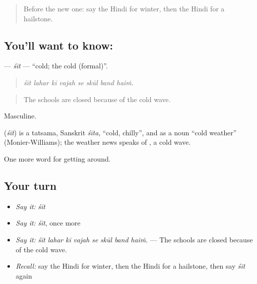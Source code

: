 \label{lesson:HI-C438-sit}



\begin{quote}
Before the new one: say the Hindi for winter, then the Hindi for a hailstone.
\end{quote}

\subsection*{You'll want to know: }
\textbf{} — \emph{śīt} — \textquotedblleft{}cold; the cold (formal)\textquotedblright{}.

\begin{quote}
       
\end{quote}

\begin{quote}
\emph{śīt lahar kī vajah se skūl band haiṁ.}
\end{quote}

\begin{quote}
The schools are closed because of the cold wave.
\end{quote}

Masculine.

\begin{cousinweb}
\textbf{} (\emph{śīt}) is a tatsama, Sanskrit \emph{śīta}, \textquotedblleft{}cold, chilly\textquotedblright{}, and as a noun \textquotedblleft{}cold weather\textquotedblright{} (Monier-Williams); the weather news speaks of  , a cold wave.
\end{cousinweb}

\begin{grammarlens}[title={What you've built}]
One more word for getting around.
\end{grammarlens}

\subsection*{Your turn}
\begin{itemize}
\raggedright
  \item \emph{Say it:} \emph{śīt}
  \item \emph{Say it:} \emph{śīt}, once more
  \item \emph{Say it:} \emph{śīt lahar kī vajah se skūl band haiṁ.} — The schools are closed because of the cold wave.
  \item \emph{Recall:} say the Hindi for winter, then the Hindi for a hailstone, then say \emph{śīt} again
\end{itemize}

